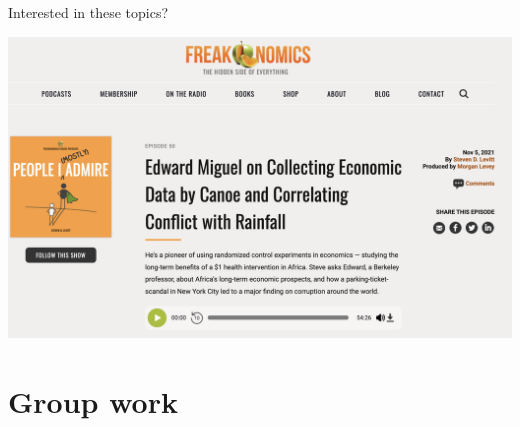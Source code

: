 \documentclass[11pt,xcolor=table]{beamer}
\begin{document}
\begin{frame}{Interested in these topics?}

\href{https://freakonomics.com/podcast/edward-miguel-on-collecting-economic-data-by-canoe-and-correlating-conflict-with-rainfall/}{\includegraphics[width=\textwidth]{figures/IV Rain/freakonomics.png}}

\end{frame}


\section{Group work}
\end{document}
